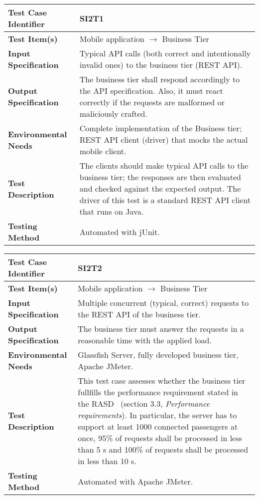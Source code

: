 \begin{tabular}{l p{}}
    \hline
    \textbf{Test Case Identifier} & SI2T1\\
    \hline
    \textbf{Test Item(s)} & Mobile application $\rightarrow$ Business Tier\\
    \hline
    \textbf{Input Specification} & Typical API calls (both correct and intentionally invalid ones) to the business tier (REST API).\\
    \hline
    \textbf{Output Specification} & The business tier shall respond accordingly to the API specification. Also, it must react correctly if the requests are malformed or maliciously crafted.\\
    \hline
    \textbf{Environmental Needs} & Complete implementation of the Business tier; REST API client (driver) that mocks the actual mobile client. \\
    \hline
    \textbf{Test Description} & The clients should make typical API calls to the business tier; the responses are then evaluated and checked against the expected output. The driver of this test is a standard REST API client that runs on Java.\\
    \hline
    \textbf{Testing Method} & Automated with jUnit. \\
    \hline
\end{tabular}

\vspace{2em}

\noindent\begin{tabular}{l p{}}
    \hline
    \textbf{Test Case Identifier} & SI2T2\\
    \hline
    \textbf{Test Item(s)} & Mobile application $\rightarrow$ Business Tier\\
    \hline
    \textbf{Input Specification} & Multiple concurrent (typical, correct) requests to the REST API of the business tier.\\
    \hline
    \textbf{Output Specification} & The business tier must answer the requests in a reasonable time with the applied load. \\
    \hline
    \textbf{Environmental Needs} & Glassfish Server, fully developed business tier, Apache JMeter.\\
    \hline
    \textbf{Test Description} & This test case assesses whether the business tier fullfills the performance requirement stated in the RASD~\cite{mytaxi-rasd} (section 3.3, \emph{Performance requirements}). In particular, the server has to support at least 1000 connected passengers at once, 95\% of requests shall be processed in less than 5 s and 100\% of requests shall be processed in less than 10 s.\\
    \hline
    \textbf{Testing Method} & Automated with Apache JMeter. \\
    \hline
\end{tabular}


